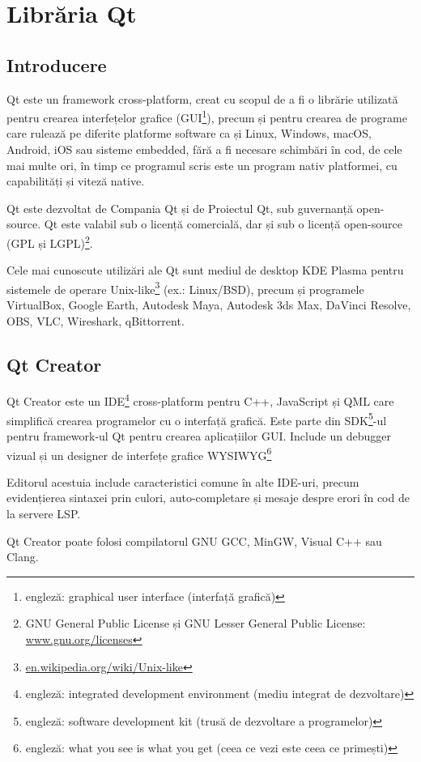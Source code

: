 \section{Librăria Qt}
\subsection{Introducere}
Qt este un framework cross-platform, creat cu scopul de a fi o librărie utilizată pentru crearea interfețelor grafice (GUI\footnote{engleză: graphical user interface (interfață grafică)}), precum și pentru crearea de programe care rulează pe diferite platforme software ca și Linux, Windows, macOS, Android, iOS sau sisteme embedded, fără a fi necesare schimbări în cod, de cele mai multe ori, în timp ce programul scris este un program nativ platformei, cu capabilități și viteză native.

Qt este dezvoltat de Compania Qt și de Proiectul Qt, sub guvernanță open-source. Qt este valabil sub o licență comercială, dar și sub o licență open-source (GPL și LGPL)\footnote{GNU General Public License și GNU Lesser General Public License: \url{www.gnu.org/licenses}}.

Cele mai cunoscute utilizări ale Qt sunt mediul de desktop KDE Plasma pentru sistemele de operare Unix-like\footnote{\url{en.wikipedia.org/wiki/Unix-like}} (ex.: Linux/BSD), precum și programele VirtualBox, Google Earth, Autodesk Maya, Autodesk 3ds Max, DaVinci Resolve, OBS, VLC, Wireshark, qBittorrent.

\subsection{Qt Creator} \label{qtcreator}
Qt Creator este un IDE\footnote{engleză: integrated development environment (mediu integrat de dezvoltare)} cross-platform pentru C++, JavaScript și QML care simplifică crearea programelor cu o interfață grafică.
Este parte din SDK\footnote{engleză: software development kit (trusă de dezvoltare a programelor)}-ul pentru framework-ul Qt pentru crearea aplicațiilor GUI. Include un debugger vizual și un designer de interfețe grafice WYSIWYG\footnote{engleză: what you see is what you get (ceea ce vezi este ceea ce primești)}

Editorul acestuia include caracteristici comune în alte IDE-uri, precum evidențierea sintaxei prin culori, auto-completare și mesaje despre erori în cod de la servere LSP.

Qt Creator poate folosi compilatorul GNU GCC, MinGW, Visual C++ sau Clang.

